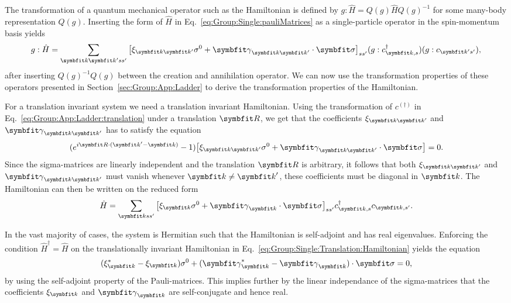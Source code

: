 The transformation of a quantum mechanical operator such as the Hamiltonian is defined by $g:\hat{H} = Q(g)\hat{H}Q(g)^{-1}$ for some many-body
representation $Q(g)$. Inserting the form of $\hat{H}$ in Eq.~\eqref{eq:Group:Single:pauliMatrices} as a single-particle operator in the
spin-momentum basis yields
\begin{equation}
    \label{eq:Group:Single:generalTransformedHamiltonian}
    g:\hat{H} = \sum_{\v{k}\v{k}'ss'}\big[\xi_{\v{k}\v{k}'}\sigma^0 + \v{\gamma}_{\v{k}\v{k}'}\cdot\v{\sigma}\big]_{ss'}(g:c^\dagger_{\v{k},s})(g:c_{\v{k}'s'}),
\end{equation}
after inserting $Q(g)^{-1}Q(g)$ between the creation and annihilation operator. We can now use the transformation properties of these operators presented
in Section~\ref{sec:Group:App:Ladder} to derive the transformation properties of the Hamiltonian.

For a translation invariant system we need a translation invariant Hamiltonian. Using the transformation of $c^{(\dagger)}$ in
Eq.~\eqref{eq:Group:App:Ladder:translation} under a translation $\v{R}$, we get that the coefficients $\xi_{\v{k}\v{k}'}$ and $\v{\gamma}_{\v{k}\v{k}'}$
has to satisfy the equation
\begin{equation}
    \label{eq:Group:Single:Translation:condition}
    (e^{i\v{R}\cdot(\v{k}'-\v{k})}-1)\big[\xi_{\v{k}\v{k}'}\sigma^0 + \v{\gamma}_{\v{k}\v{k}'}\cdot\v{\sigma}\big] = 0.
\end{equation}
Since the sigma-matrices are linearly independent and the translation $\v{R}$ is arbitrary, it follows that both $\xi_{\v{k}\v{k}'}$ and
$\v{\gamma}_{\v{k}\v{k}'}$ must vanish whenever $\v{k}\neq\v{k}'$, \ie these coefficients must be diagonal in $\v{k}$. The Hamiltonian can then be written on the
reduced form
\begin{equation}
    \label{eq:Group:Single:Translation:Hamiltonian}
    \hat{H} = \sum_{\v{k}ss'}\big[\xi_\v{k}\sigma^0 + \v{\gamma}_\v{k}\cdot\v{\sigma}\big]_{ss'}c^{\dagger}_{\v{k},s}c_{\v{k},s'}.
\end{equation}

In the vast majority of cases, the system is Hermitian such that the Hamiltonian is self-adjoint and has real eigenvalues. Enforcing the condition
$\hat{H}^\dagger=\hat{H}$ on the translationally invariant Hamiltonian in Eq.~\eqref{eq:Group:Single:Translation:Hamiltonian} yields the equation
\begin{equation}
    \label{eq:Group:Single:Hermitian:condition}
    (\xi_\v{k}^\ast-\xi_{\v{k}})\sigma^0 + (\v{\gamma}^\ast_\v{k}-\v{\gamma}_\v{k})\cdot\v{\sigma} = 0,
\end{equation}
by using the self-adjoint property of the Pauli-matrices. This implies further by the linear independance of the sigma-matrices that the coefficients $\xi_\v{k}$
and $\v{\gamma}_\v{k}$ are self-conjugate and hence real.

